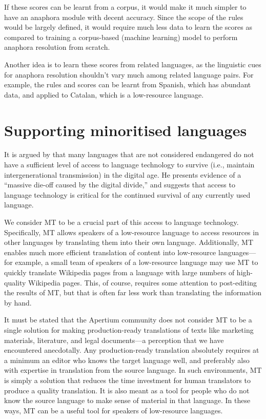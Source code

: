 \documentclass[free]{flammie}
\begin{document}
If these scores can be learnt from a corpus, it would make it much simpler to
have an anaphora module with decent accuracy. Since the scope of the rules would
be largely defined, it would require much less data to learn the scores as
compared to training a corpus-based (machine learning) model to perform anaphora
resolution from scratch.

Another idea is to learn these scores from related languages, as the linguistic
cues for anaphora resolution shouldn't vary much among related language pairs.
For example, the rules and scores can be learnt from Spanish, which has abundant
data, and applied to Catalan, which is a low-resource language.

\section{Supporting minoritised languages} \label{sec:LinguisticsOfEnden}

It is argued by \cite{kornai2013digital} that many languages that are not considered
endangered do not have a sufficient level of access to language technology to
survive (i.e., maintain intergenerational transmission) in the digital age.  He
presents evidence of a ``massive die-off caused by the digital divide,'' and
suggests that access to language technology is critical for the continued
survival of any currently used language.

We consider MT to be a crucial part of this access to language technology.
Specifically, MT allows speakers of a low-resource language to access resources
in other languages by translating them into their own language.  Additionally,
MT enables much more efficient translation of content into low-resource
languages---for example, a small team of speakers of a low-resource language may
use MT to quickly translate Wikipedia pages from a language with large numbers
of high-quality Wikipedia pages.  This, of course, requires some attention to
post-editing the results of MT, but that is often far less work than translating
the information by hand.

It must be stated that the Apertium community does not consider MT to be a
single solution for making production-ready translations of texts like marketing
materials, literature, and legal documents---a perception that we have
encountered anecdotally.  Any production-ready translation absolutely requires
at a minimum an editor who knows the target language well, and preferably also
with expertise in translation from the source language.  In such environments,
MT is simply a solution that reduces the time investment for human translators
to produce a quality translation.  It is also meant as a tool for people who do
not know the source language to make sense of material in that language.  In
these ways, MT can be a useful tool for speakers of low-resource languages.
\end{document}
